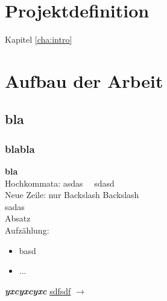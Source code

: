 \section{Projektdefinition}
Kapitel \ref{cha:intro}

\section{Aufbau der Arbeit}
\subsection{bla}
\subsubsection{blabla}
\textbf{bla}\\
Hochkommata: \glqq asdas\grqq~~ sdasd\\

Neue Zeile: nur Backslash Backslash\\
sadas\\

Absatz\\

Aufzählung:
\begin{itemize}
	\item basd
	\item ...
\end{itemize}

\textit{\textbf{yxcyxcyxc}}
\underline{sdfsdf}
$\rightarrow$





